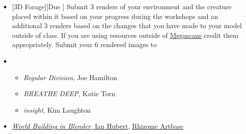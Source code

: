 \begin{itemize}[noitemsep,topsep=0pt,leftmargin=*]
    \item {}[3D Forage][Due \dSun] Submit 3 renders of your environment and the creature placed within it based on your progress during the workshops and an additional 3 renders based on the changes that you have made to your model outside of class. If you are using resources outside of \href{https://quixel.com/megascans}{Megascans} credit them appropriately. Submit your 6 rendered images to \discordE
    \item {}
          \begin{itemize}
              \item \emph{Regular Division}, Joe Hamilton
              \item \emph{BREATHE DEEP}, Katie Torn
              \item \emph{insight}, Kim Laughton
          \end{itemize}
    \item {} \href{https://www.youtube.com/watch?v=whPWKecazgM}{\emph{World Building in Blender}, Ian Hubert}, \href{https://rhizome.org/art/artbase/}{Rhizome Artbase}
\end{itemize}